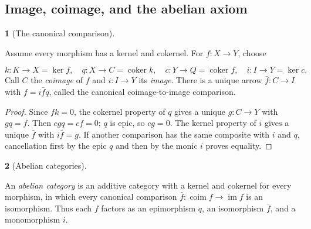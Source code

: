 \documentclass[11pt,a4paper]{article}
\newcommand{\mathheading}{}
\theoremstyle{plain}
\theoremstyle{definition}
\newtheorem*{definitionstatement}{\mathheading}
\newenvironment{mathdefinition}[3]{\renewcommand{\mathheading}{#1 #2}\begin{definitionstatement}[#3]}{\end{definitionstatement}}
\begin{document}
\subsection{Image, coimage, and the abelian axiom}

\begin{mathdefinition}{Definition}{4.3}{The canonical comparison}
\label{env-4-3}

Assume every morphism has a kernel and cokernel. For \(f:X\to Y\), choose

\[k:K\to X=\ker f,\quad q:X\to C=\operatorname{coker}k,\quad c:Y\to Q=\operatorname{coker}f,\quad i:I\to Y=\ker c.\] 
Call \(C\) the \emph{coimage} of \(f\) and \(i:I\to Y\) its \emph{image}. There is a unique arrow \(\bar f:C\to I\) with \(f=i\bar f q\), called the canonical coimage-to-image comparison.


\par{}\par

\end{mathdefinition}
 
\begin{proof}

Since \(fk=0\), the cokernel property of \(q\) gives a unique \(g:C\to Y\) with \(gq=f\). Then \(cgq=cf=0\); \(q\) is epic, so \(cg=0\). The kernel property of \(i\) gives a unique \(\bar f\) with \(i\bar f=g\). If another comparison has the same composite with \(i\) and \(q\), cancellation first by the epic \(q\) and then by the monic \(i\) proves equality.


\end{proof}
 
\begin{mathdefinition}{Definition}{4.4}{Abelian categories}
\label{env-4-4}

An \emph{abelian category} is an additive category with a kernel and cokernel for every morphism, in which every canonical comparison \(\bar f:\operatorname{coim}f\to\operatorname{im}f\) is an isomorphism. Thus each \(f\) factors as an epimorphism \(q\), an isomorphism \(\bar f\), and a monomorphism \(i\).


\par{}\par

\end{mathdefinition}
 
\end{document}
